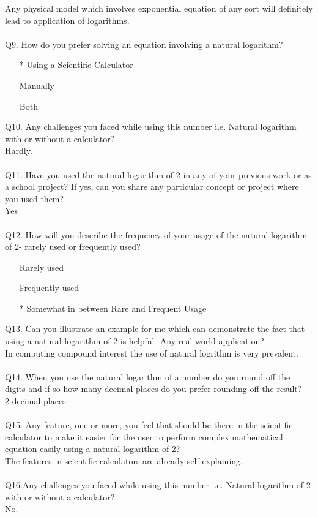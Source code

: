 \documentclass[12pt]{article}
\makeatletter
\newcommand*{\radiobutton}{%
  \@ifstar{\@radiobutton0}{\@radiobutton1}%
}
\newcommand*{\@radiobutton}[1]{%
  \begin{tikzpicture}
    \pgfmathsetlengthmacro\radius{height("X")/2}
    \draw[radius=\radius] circle;
    \ifcase#1 \fill[radius=.6*\radius] circle;\fi
  \end{tikzpicture}%
}
\makeatother
\begin{document}
Any physical model which involves exponential equation of any sort will definitely lead to application of logarithms.\\\\
Q9. How do you prefer solving an equation involving a natural logarithm?
\begin{itemize}
\item[\radiobutton*] Using a Scientific Calculator
\item[\radiobutton] Manually
\item[\radiobutton] Both
\end{itemize}
Q10. Any challenges you faced while using this number i.e. Natural logarithm with or without a calculator?\\
Hardly.\\\\
Q11. Have you used the natural logarithm of 2 in any of your previous work or as a school project? If yes, can you share any particular concept or project where you used them?\\
Yes\\\\
Q12. How will you describe the frequency of your usage of the natural logarithm of 2- rarely used or frequently used?\\
\begin{itemize}
\item[\radiobutton] Rarely used
\item[\radiobutton] Frequently used
\item[\radiobutton*] Somewhat in between Rare and Frequent Usage
\end{itemize}
Q13. Can you illustrate an example for me which can demonstrate the fact that using a natural logarithm of 2 is helpful- Any real-world application?\\
In computing compound interest the use of natural logrithm is very prevalent.\\\\
Q14. When you use the natural logarithm of a number do you round off the digits and if so how many decimal places do you prefer rounding off the result? \\
2 decimal places\\\\
Q15. Any feature, one or more, you feel that should be there in the scientific calculator to make it easier for the user to perform complex mathematical equation easily using a natural logarithm of 2?\\
The features in scientific calculators are already self explaining.\\\\
Q16.Any challenges you faced while using this number i.e. Natural logarithm of 2 with or without a calculator?\\
No.
\end{document}
